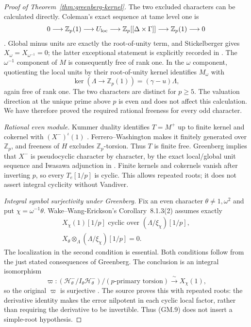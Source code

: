 \documentclass[11pt,a4paper]{article}
\theoremstyle{definition}
\begin{document}
\begin{proof}[Proof of Theorem~\ref{thm:greenberg-kernel}]
The two excluded characters can be calculated directly.
Coleman's exact sequence at tame level one is
\[
 0\longrightarrow\mathbb Z_p(1)\longrightarrow U_{\rm loc}
 \longrightarrow\mathbb Z_p[[\Delta\times\Gamma]]
 \longrightarrow\mathbb Z_p(1)\longrightarrow0
\]
\cite[Theorem~5.5.31, p.~148; Proposition~6.1.1,
pp.~151--152]{SharifiIwasawaNotes}.
Global minus units are exactly the root-of-unity term, and
Stickelberger gives $X_\omega=X_{\omega^{-1}}=0$; the latter
exceptional statement is explicitly recorded in
\cite[proof of Lemma~5.2.7, p.~13]{WakeWangErickson2017}.
The $\omega^{-1}$ component of $M$ is consequently free of rank
one. In the $\omega$ component, quotienting the local units by
their root-of-unity kernel identifies $M_\omega$ with
\[
 \ker(\Lambda\longrightarrow\mathbb Z_p(1))
     =(\gamma-u)\Lambda,
\]
again free of rank one. The two characters are distinct for
$p\ge5$. The valuation direction at the unique prime above $p$
is even and does not affect this calculation. We have therefore
proved the required rational freeness for every odd character.

\emph{Rational even module.}
Kummer duality identifies $T=M^+$ up to finite kernel and cokernel
with $(X^-)^\iota(1)$
\cite[Proposition~3.4.7 and Corollary~3.4.8,
p.~92]{SharifiIwasawaNotes}.
Ferrero--Washington makes it finitely generated over $\mathbb Z_p$,
and freeness of $H$ excludes $\mathbb Z_p$-torsion. Thus $T$ is
finite free. Greenberg implies that $X^-$ is pseudocyclic
character by character, by the exact local/global unit sequence and
Iwasawa adjunction in
\cite[Corollary~2.1.3 and Conjecture~2.1.5 with the following
explanation, p.~8]{WakeWangEricksonPseudo2018}.
Finite kernels and cokernels vanish after inverting $p$, so every
$T_e[1/p]$ is cyclic. This allows repeated roots; it does not assert
integral cyclicity without Vandiver.

\emph{Integral symbol surjectivity under Greenberg.}
Fix an even character $\theta\ne1,\omega^2$ and put
$\chi=\omega^{-1}\theta$. Wake--Wang-Erickson's
Corollary~8.1.3(2) assumes exactly
\[
 \begin{gathered}
 X_\chi(1)[1/p]\text{ cyclic over }(\Lambda/\xi_\chi)[1/p],\\
 X_\theta\otimes_\Lambda(\Lambda/\xi_\chi)[1/p]=0.
 \end{gathered}                                            \tag{GM.8}
\]
The localization in the second condition is essential.
Both conditions follow from the just stated consequences of
Greenberg. The conclusion is an integral isomorphism
\[
 \varpi:(\mathcal H^-_\theta/I_\theta\mathcal H^-_\theta)
           /(p\text{-primary torsion})
       \xrightarrow{\ \sim\ }X_\chi(1),                    \tag{GM.9}
\]
so the original $\varpi$ is surjective
\cite[Corollary~8.1.3 and complete proof,
pp.~48--49]{WakeWangEricksonPseudo2018}.
The source proves this with repeated roots: the derivative identity
makes the error nilpotent in each cyclic local factor, rather than
requiring the derivative to be invertible. Thus (GM.9) does not
insert a simple-root hypothesis.


\end{proof}
\end{document}
